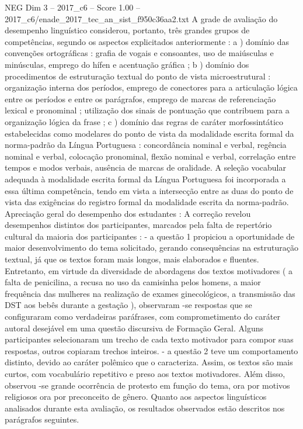 \begin{textsample}{NEG Dim 3 – 2017\_c6 – Score 1.00 – 2017\_c6/enade\_2017\_tec\_an\_sist\_f950c36aa2.txt}
A grade de avaliação do desempenho linguístico considerou, portanto, três grandes grupos de competências, segundo os aspectos explicitados anteriormente : a ) domínio das convenções ortográficas : grafia de vogais e consoantes, uso de maiúsculas e minúsculas, emprego do hífen e acentuação gráfica ; b ) domínio dos procedimentos de estruturação textual do ponto de vista microestrutural : organização interna dos períodos, emprego de conectores para a articulação lógica entre os períodos e entre os parágrafos, emprego de marcas de referenciação lexical e pronominal ; utilização dos sinais de pontuação que contribuem para a organização lógica da frase ; c ) domínio das regras de caráter morfossintático estabelecidas como modelares do ponto de vista da modalidade escrita formal da norma-padrão da Língua Portuguesa : concordância nominal e verbal, regência nominal e verbal, colocação pronominal, flexão nominal e verbal, correlação entre tempos e modos verbais, ausência de marcas de oralidade.
A seleção vocabular adequada à modalidade escrita formal da Língua Portuguesa foi incorporada a essa última competência, tendo em vista a intersecção entre as duas do ponto de vista das exigências do registro formal da modalidade escrita da norma-padrão.
Apreciação geral do desempenho dos estudantes : A correção revelou desempenhos distintos dos participantes, marcados pela falta de repertório cultural da maioria dos participantes : - a questão 1 propiciou a oportunidade de maior desenvolvimento do tema solicitado, gerando consequências na estruturação textual, já que os textos foram mais longos, mais elaborados e fluentes.
Entretanto, em virtude da diversidade de abordagens dos textos motivadores ( a falta de penicilina, a recusa no uso da camisinha pelos homens, a maior frequência das mulheres na realização de exames ginecológicos, a transmissão das DST aos bebês durante a gestação ), observaram -se respostas que se configuraram como verdadeiras paráfrases, com comprometimento do caráter autoral desejável em uma questão discursiva de Formação Geral.
Alguns participantes selecionaram um trecho de cada texto motivador para compor suas respostas, outros copiaram trechos inteiros. - a questão 2 teve um comportamento distinto, devido ao caráter polêmico que o caracteriza.
Assim, os textos são mais curtos, com vocabulário repetitivo e preso aos textos motivadores.
Além disso, observou -se grande ocorrência de protesto em função do tema, ora por motivos religiosos ora por preconceito de gênero.
Quanto aos aspectos linguísticos analisados durante esta avaliação, os resultados observados estão descritos nos parágrafos seguintes.

\end{textsample}
